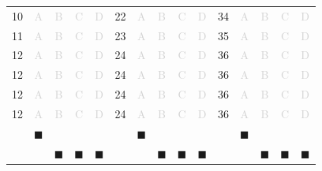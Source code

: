 \documentclass[a4paper,11pt]{article}
\newcommand{\light}[1]{\textcolor{lightgray}{#1}}
\begin{document}
\begin{center}
\begin{tabular}{r|c|c|c|c|r|c|c|c|c|r|c|c|c|c|}
\cline{2-5} \cline{7-10} \cline{12-15}
10& \light{A} & \light{B} & \light{C} & \light{D} & 22& \light{A} & \light{B} & \light{C} & \light{D} & 34& \light{A} & \light{B} & \light{C} & \light{D} \\
\cline{2-5} \cline{7-10} \cline{12-15}
11& \light{A} & \light{B} & \light{C} & \light{D} & 23& \light{A} & \light{B} & \light{C} & \light{D} & 35& \light{A} & \light{B} & \light{C} & \light{D} \\
\cline{2-5} \cline{7-10} \cline{12-15}
12& \light{A} & \light{B} & \light{C} & \light{D} & 24& \light{A} & \light{B} & \light{C} & \light{D} & 36& \light{A} & \light{B} & \light{C} & \light{D} \\
\cline{2-5} \cline{7-10} \cline{12-15}
12& \light{A} & \light{B} & \light{C} & \light{D} & 24& \light{A} & \light{B} & \light{C} & \light{D} & 36& \light{A} & \light{B} & \light{C} & \light{D} \\
\cline{2-5} \cline{7-10} \cline{12-15}
12& \light{A} & \light{B} & \light{C} & \light{D} & 24& \light{A} & \light{B} & \light{C} & \light{D} & 36& \light{A} & \light{B} & \light{C} & \light{D} \\
\cline{2-5} \cline{7-10} \cline{12-15}
12& \light{A} & \light{B} & \light{C} & \light{D} & 24& \light{A} & \light{B} & \light{C} & \light{D} & 36& \light{A} & \light{B} & \light{C} & \light{D} \\
\cline{2-5} \cline{7-10} \cline{12-15}
\multicolumn{1}{c}{} & \multicolumn{1}{c}{$\blacksquare$} & \multicolumn{1}{c}{} & \multicolumn{1}{c}{} & \multicolumn{1}{c}{} & \multicolumn{1}{c}{} & \multicolumn{1}{c}{$\blacksquare$} & \multicolumn{1}{c}{} & \multicolumn{1}{c}{} & \multicolumn{1}{c}{} & \multicolumn{1}{c}{} & \multicolumn{1}{c}{$\blacksquare$} & \multicolumn{1}{c}{} & \multicolumn{1}{c}{} & \multicolumn{1}{c}{}\\ 
\multicolumn{1}{c}{} & \multicolumn{1}{c}{} & \multicolumn{1}{c}{$\blacksquare$} & \multicolumn{1}{c}{$\blacksquare$} & \multicolumn{1}{c}{$\blacksquare$} & \multicolumn{1}{c}{} & \multicolumn{1}{c}{} & \multicolumn{1}{c}{$\blacksquare$} & \multicolumn{1}{c}{$\blacksquare$} & \multicolumn{1}{c}{$\blacksquare$} & \multicolumn{1}{c}{} & \multicolumn{1}{c}{} & \multicolumn{1}{c}{$\blacksquare$} & \multicolumn{1}{c}{$\blacksquare$} & \multicolumn{1}{c}{$\blacksquare$}\\ 
\end{tabular}
\end{center}
\end{document}
